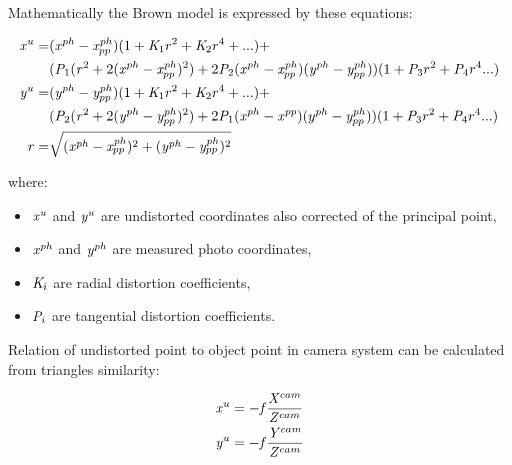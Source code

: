\documentclass[a4paper,12pt]{article}
\newcommand{\escal}[1]{
{\it #1}
}
\begin{document}
Mathematically the Brown model is expressed by these equations:

\begin{equation}
\label{eq:undistort}
\begin{split}
\escal{x}^{u} =& (\escal{x}^{ph} - \escal{x}^{ph}_{pp})(1 + \escal{K}_{1}r^2 + \escal{K}_2r^4 + ...) + \\
&(\escal{P}_1(\escal{r}^2 + 2(\escal{x}^{ph} - \escal{x}^{ph}_{pp})^2) + 2\escal{P}_2(\escal{x}^{ph} - \escal{x}^{ph}_{pp})(\escal{y}^{ph} - \escal{y}^{ph}_{pp}))(1 + \escal{P}_3r^2 + \escal{P}_4r^4 ...) \\
\escal{y}^{u} =& (\escal{y}^{ph} - \escal{y}^{ph}_{pp})(1 + \escal{K}_1r^2 + \escal{K}_2r^4 + ...) + \\
&(\escal{P}_2(\escal{r}^2 + 2(\escal{y}^{ph} - \escal{y}^{ph}_{pp})^2) + 2\escal{P}_1(\escal{x}^{ph} - \escal{x}^{pp})(y^{ph} - \escal{y}^{ph}_{pp}))(1 + \escal{P}_3r^2 + \escal{P}_4r^4 ...) \\
\escal{r} =& \sqrt{(\escal{x}^{ph} - \escal{x}^{ph}_{pp})^2 + (\escal{y}^{ph} - \escal{y}^{ph}_{pp})^2}
\end{split}
\end{equation}

where:


\begin{itemize}
  \item $\escal{x}^{u}$ and $\escal{y}^{u}$  are undistorted coordinates also corrected of the principal point,
  \item $\escal{x}^{ph}$ and $\escal{y}^{ph}$ are measured photo coordinates,
  \item $\escal{K}_{i}$ are radial distortion coefficients,
  \item $\escal{P}_{i}$ are tangential distortion coefficients.
\end{itemize}


Relation of undistorted point to object point in camera system can be calculated from 
triangles similarity:

\begin{equation}
\begin{split}
&\escal{x}^{u} =  - \escal{f} \frac{\escal{X}^{cam}}{\escal{Z}^{cam}}   \\
&\escal{y}^{u} = - \escal{f} \frac{\escal{Y}^{cam}}{\escal{Z}^{cam}} 
\end{split}
\end{equation}
\end{document}
